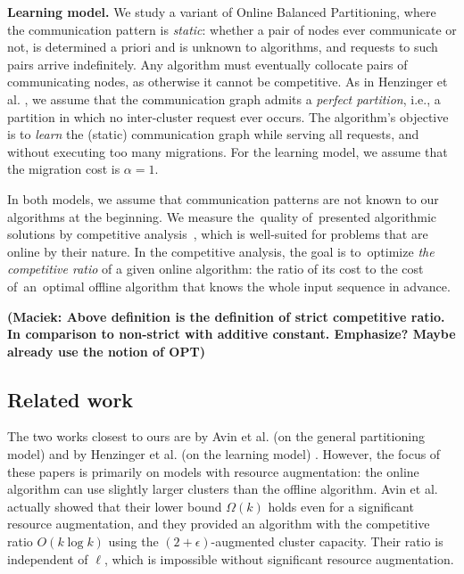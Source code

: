 \documentclass[a4paper,anonymous,USenglish]{lipics-v2019}
\newcommand{\OPT}{\textsc{OPT}\xspace}
\newcommand\maciek[1]{\color{brown}\textbf{(Maciek: #1)}\color{black}}
\begin{document}
\noindent
\textbf{Learning model.}
We study a variant of Online Balanced Partitioning,
where the communication pattern is \emph{static}:
whether a pair of  nodes ever communicate or not, 
is determined a priori and is unknown to algorithms,
 and requests to such pairs arrive indefinitely.
Any algorithm must eventually collocate  pairs of communicating nodes,
as otherwise it cannot be competitive.
As in Henzinger et al. \cite{sigmetrics19_partitioning}, we assume that the communication graph admits a \emph{perfect partition},
i.e., a partition in which no inter-cluster request ever occurs.
The algorithm's objective is to \emph{learn} the (static) communication graph
 while serving all requests,
and without executing too many migrations.
For the learning model, we  assume that the migration cost is $\alpha=1$.

\medskip 
In both models, we assume that communication patterns are not known to our algorithms at the beginning.
We measure the~quality of~presented algorithmic solutions by competitive analysis~\cite{borodin-book}, which is well-suited for problems that are online by their nature.
In the competitive analysis, the goal is to~optimize \emph{the competitive ratio} of a given online algorithm: the ratio of its cost to the cost of~an~optimal offline algorithm that knows the whole input sequence in advance.

\maciek{Above definition is the definition of strict competitive ratio. In comparison to non-strict with additive constant. Emphasize? Maybe already use the notion of \OPT}


\subsection{Related work}

The two works closest to ours are by Avin et al. (on the general partitioning model) \cite{repartition-disc, sidma-arxiv} and by Henzinger et al. (on the learning model) \cite{sigmetrics19_partitioning}.
However, the focus of these papers is primarily on models with resource augmentation: the online algorithm can use slightly larger clusters than the offline algorithm.  
Avin et al. actually showed that their lower bound $\Omega(k)$ holds even for a significant resource augmentation, and they provided an algorithm with the competitive ratio $O(k \log k)$ using the $(2+\epsilon)$-augmented cluster capacity.
Their ratio is independent of $\ell$, which is impossible without significant resource augmentation.
\end{document}
